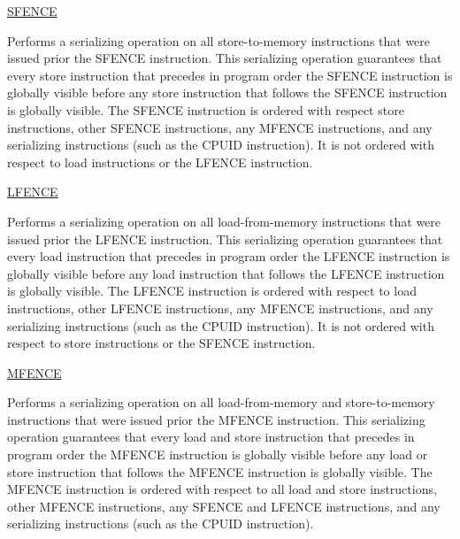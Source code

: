 \begin{itemize}
\begin{item}
\href{http://www.intel.com/Assets/PDF/manual/253667.pdf}{SFENCE} \citep{IntelArch}

Performs a serializing operation on all store-to-memory instructions that were issued prior the SFENCE instruction. This serializing operation guarantees that every store instruction that precedes in program order the SFENCE instruction is globally visible before any store instruction that follows the SFENCE instruction is globally visible. The SFENCE instruction is ordered with respect store instructions, other SFENCE instructions, any MFENCE instructions, and any serializing instructions (such as the CPUID instruction). It is not ordered with respect to load instructions or the LFENCE instruction.
\end{item}

\begin{item}
\href{http://www.intel.com/Assets/PDF/manual/253666.pdf}{LFENCE}

Performs a serializing operation on all load-from-memory instructions that were issued prior the LFENCE instruction. This serializing operation guarantees that every load instruction that precedes in program order the LFENCE instruction is globally visible before any load instruction that follows the LFENCE instruction is globally visible. The LFENCE instruction is ordered with respect to load instructions, other LFENCE instructions, any MFENCE instructions, and any serializing instructions (such as the CPUID instruction). It is not ordered with respect to store instructions or the SFENCE instruction.
\end{item}
\begin{item}
\href{http://www.intel.com/Assets/PDF/manual/253666.pdf}{MFENCE}

Performs a serializing operation on all load-from-memory and store-to-memory instructions that were issued prior the MFENCE instruction. This serializing operation guarantees that every load and store instruction that precedes in program order the MFENCE instruction is globally visible before any load or store instruction that follows the MFENCE instruction is globally visible. The MFENCE instruction is ordered with respect to all load and store instructions, other MFENCE instructions, any SFENCE and LFENCE instructions, and any serializing instructions (such as the CPUID instruction).
\end{item}
\end{itemize}

